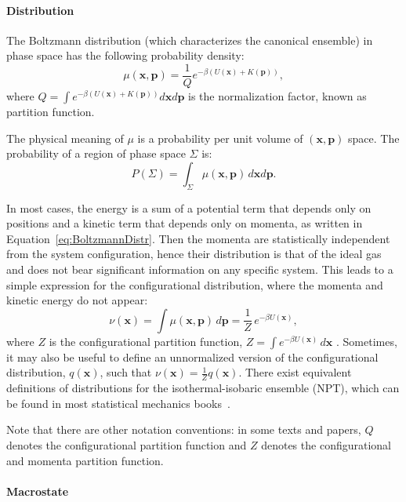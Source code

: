 \documentclass[9pt,review]{livecoms}
\newcommand{\vx}{\mathbf{x}}
\newcommand{\vp}{\mathbf{p}}
\begin{document}
\hypertarget{ref:Distribution}{\paragraph{Distribution}}

The Boltzmann distribution (which characterizes the canonical ensemble) in phase space has the following probability density:
\begin{equation}
\mu(\vx, \vp) = \frac{1}{Q} e^{-\beta (U(\vx) + K(\vp))},
\label{eq:BoltzmannDistr}
\end{equation}
where $ \displaystyle Q = \int e^{-\beta (U(\vx) + K(\vp))} d\vx d\vp$ is the normalization factor, known as partition function.

The physical meaning of $\mu$ is a probability per unit volume of $(\vx, \vp)$ space. The probability of a region of phase space $\Sigma$ is:
\begin{equation}
    P(\Sigma) = \int_\Sigma \mu(\vx, \vp) \, d\vx d\vp.
\end{equation}

In most cases, the energy is a sum of a potential term that depends only on positions and a kinetic term that depends only on momenta, as written in Equation~\ref{eq:BoltzmannDistr}.
Then the momenta are statistically independent from the system configuration, hence their distribution is that of the ideal gas and does not bear significant information on any specific system.
This leads to a simple expression for the configurational distribution, where the momenta and kinetic energy do not appear:
\begin{equation}
\nu(\vx) = \int \mu(\vx, \vp) \, d\vp = \frac{1}{Z} \, e^{-\beta U(\vx)},
\end{equation}
where $Z$ is the configurational partition function, $ Z = \int e^{-\beta U(\vx)} \, d\vx$ . Sometimes, it may also be useful to define an unnormalized version of the configurational distribution, $q(\vx)$, such that $\nu(\vx) = \frac{1}{Z}q(\vx)$. There exist equivalent definitions of distributions for the isothermal-isobaric ensemble (NPT), which can be found in most statistical mechanics books~\cite{Zuckerman2010, Tuckerman2010}.

Note that there are other notation conventions: in some texts and papers, $Q$ denotes the configurational partition function and $Z$ denotes the configurational and momenta partition function.


\hypertarget{ref:Macrostate} {\paragraph{Macrostate}}
\end{document}
